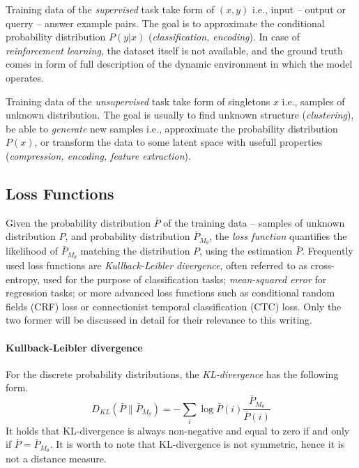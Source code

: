 Training data of the \emph{supervised} task take form of $(x,y)$ i.e., input -- output or querry -- answer example pairs. The goal is to approximate the conditional probability distribution $P(y|x)$ (\emph{classification, encoding}). In case of \emph{reinforcement learning}, the dataset itself is not available, and the ground truth comes in form of full description of the dynamic environment in which the model operates.

Training data of the \emph{unsupervised} task take form of singletons $x$ i.e., samples of unknown distribution. The goal is usually to find unknown structure (\emph{clustering}), be able to \emph{generate} new samples i.e., approximate the probability distribution $P(x)$, or transform the data to some latent space with usefull properties (\emph{compression, encoding, feature extraction}).

\subsection{Loss Functions}
\label{sec:loss_fnc}

Given the probability distribution $\bar{P}$ of the training data -- samples of unknown distribution $P$, and probability distribution $\bar{P}_{M_\theta}$, the \emph{loss function} quantifies the likelihood of $\bar{P}_{M_\theta}$ matching the distribution $P$, using the estimation $\bar{P}$. Frequently used loss functions are \emph{Kullback-Leibler divergence}, often referred to as cross-entropy, used for the purpose of classification tasks; \emph{mean-squared error} for regression tasks; or more advanced loss functions such as conditional random fields (CRF) loss or connectionist temporal classification (CTC) loss. Only the two former will be discussed in detail for their relevance to this writing.

\paragraph{Kullback-Leibler divergence}
For the discrete probability distributions, the \emph{KL-divergence} has the following form.
\begin{equation} \label{eqn:kl_divergence}
D_{KL}(\bar{P} \parallel \bar{P}_{M_\theta}) = - \sum\limits_{i} \log \bar{P}(i)\frac{\bar{P}_{M_\theta}}{\bar{P}(i)}
\end{equation}
It holds that KL-divergence is always non-negative and equal to zero if and only if $\bar{P} = \bar{P}_{M_\theta}$. It is worth to note that KL-divergence is not symmetric, hence it is not a distance measure.

